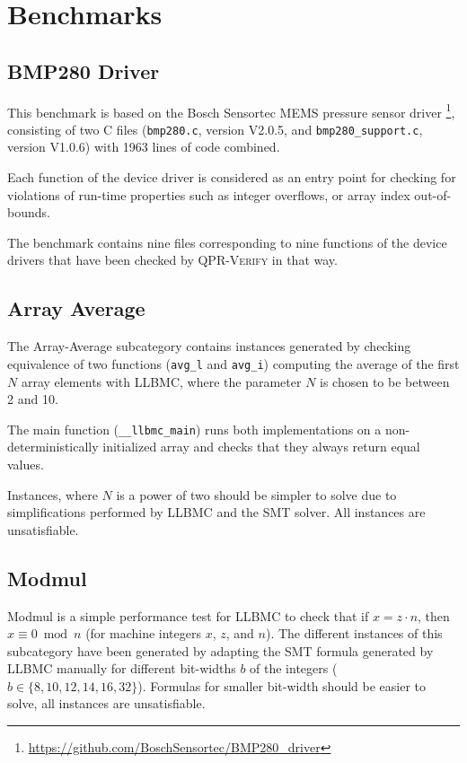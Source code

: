 \documentclass[conference]{IEEEtran}
\begin{document}
\section{Benchmarks}

\subsection{BMP280 Driver}

This benchmark is based on the Bosch Sensortec MEMS pressure sensor
driver \footnote{\url{https://github.com/BoschSensortec/BMP280_driver}},
consisting of two C files (\texttt{bmp280.c}, version V2.0.5, and
\texttt{bmp280\_support.c}, version V1.0.6)
with 1963 lines of code combined.

Each function of the device driver is considered as an entry point for
checking for violations of run-time properties such as integer overflows, or
array index out-of-bounds.

The benchmark contains nine files corresponding to nine functions of the device
drivers that have been checked by \textsc{QPR-Verify} in that way.

\subsection{Array Average}

The Array-Average subcategory contains instances generated by checking 
equivalence of two functions (\texttt{avg\_l} and \texttt{avg\_i})
computing the average of the first $N$ array elements
with LLBMC, where the parameter $N$ is chosen to be between 2 and 10.

The main function (\texttt{\_\_llbmc\_main}) runs both implementations on
a non-deterministically initialized array and checks that they always return equal
values.

Instances, where $N$ is a power of two should be simpler to solve due to simplifications
performed by LLBMC and the SMT solver. All instances are unsatisfiable.



\subsection{Modmul}

Modmul is a simple performance test for LLBMC
to check that if $x = z \cdot n$, then $x \equiv 0 \bmod n$ (for machine integers
$x$, $z$, and $n$). The different instances of this subcategory have been generated
by adapting the SMT formula generated by LLBMC manually for different bit-widths $b$ of
the integers ($b \in \{ 8, 10, 12, 14, 16, 32 \}$). Formulas for smaller bit-width should
be easier to solve, all instances are unsatisfiable.
\end{document}
